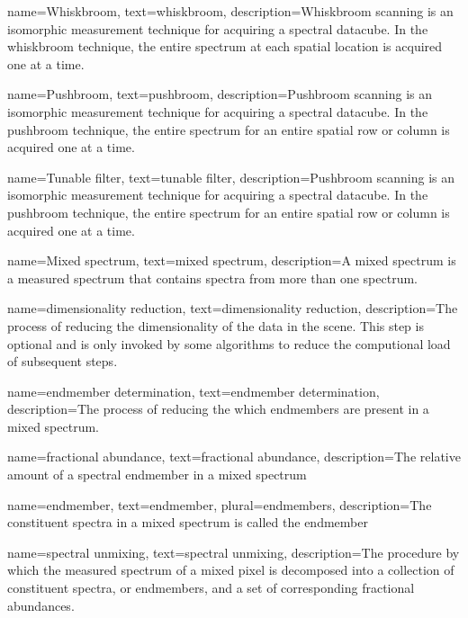 {
name={Whiskbroom},
text={whiskbroom},
description={Whiskbroom scanning is an isomorphic measurement technique for acquiring a spectral datacube. In the whiskbroom technique, the entire spectrum at each spatial location is acquired one at a time.}
}

{
name={Pushbroom},
text={pushbroom},
description={Pushbroom scanning is an isomorphic measurement technique for acquiring a spectral datacube. In the pushbroom technique, the entire spectrum for an entire spatial row or column is acquired one at a time.}
}


{
name={Tunable filter},
text={tunable filter},
description={Pushbroom scanning is an isomorphic measurement technique for acquiring a spectral datacube. In the pushbroom technique, the entire spectrum for an entire spatial row or column is acquired one at a time.}
}

{
name={Mixed spectrum},
text={mixed spectrum},
description={A mixed spectrum is a measured spectrum that contains spectra from more than one spectrum.}
}

{
name={dimensionality reduction},
text={dimensionality reduction},
description={The process of reducing the dimensionality of the data in the scene. This step is optional and is only invoked by some algorithms to reduce the computional load of subsequent steps. }
}

{
name={endmember determination},
text={endmember determination},
description={The process of reducing the which endmembers are present in a mixed spectrum. }
}

{
name={fractional abundance},
text={fractional abundance},
description={The relative amount of a spectral endmember in a mixed spectrum}
}

{
name={endmember},
text={endmember},
plural={endmembers},
description={The constituent spectra in a mixed spectrum is called the endmember}
}

{
name={spectral unmixing},
text={spectral unmixing},
description={The procedure by which the measured spectrum of a mixed pixel is decomposed into a collection of constituent spectra, or \glspl{endmember}, and a set of corresponding \glspl{fractional abundance}.}
}


